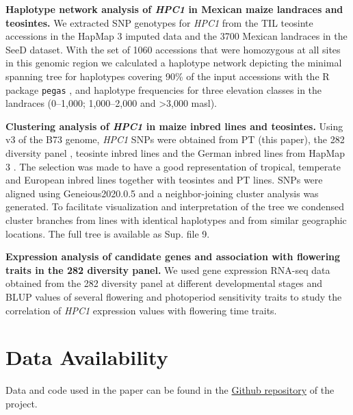 \documentclass[9pt,twocolumn,twoside,lineno]{BioRxiv}
\def\code#1{\texttt{#1}}
\begin{document}
\textbf{Haplotype network analysis of \textit{HPC1} in Mexican maize landraces and teosintes.}
We extracted SNP genotypes for \textit{HPC1} from the TIL teosinte accessions in the HapMap 3 imputed data \cite{Bukowski2017-ng} and the 3700 Mexican landraces in the SeeD dataset. 
With the set of 1060 accessions that were homozygous at all sites in this genomic region we calculated a haplotype network depicting the minimal spanning tree for haplotypes covering 90\% of the input accessions with the R package \code{pegas} \cite{paradis2010}, and haplotype frequencies for three elevation classes in the landraces (0--1,000; 1,000--2,000 and >3,000 masl).

\textbf{Clustering analysis of \textit{HPC1} in maize inbred lines and teosintes.}
Using v3 of the B73 genome, \textit{HPC1} SNPs were obtained from PT (this paper), the 282 diversity panel \cite{Flint-Garcia2005-hb}, teosinte inbred lines and the German inbred lines from HapMap 3 \cite{Bukowski2017-ng}. 
The selection was made to have a good representation of tropical, temperate and European inbred lines together with teosintes and PT lines.
SNPs were aligned using Geneious2020.0.5 and a neighbor-joining cluster analysis was generated. 
To facilitate visualization and interpretation of the tree we condensed cluster branches from lines with identical haplotypes and from similar geographic locations. 
The full tree is available as Sup. file 9. 

\textbf{Expression analysis of candidate genes and association with flowering traits in the 282 diversity panel.}
We used gene expression RNA-seq data obtained from the 282 diversity panel at different developmental stages \cite{Kremling2018-gn} and BLUP values of several flowering and photoperiod sensitivity traits \cite{Hung2012-ms} to study the correlation of \textit{HPC1} expression values with flowering time traits.  

\section{Data Availability}
Data and code used in the paper can be found in the \href{https://github.com/sawers-rellan-labs/High-PC1-paper}{Github repository} of the project. 
\end{document}
